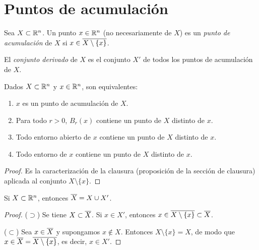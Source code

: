 \section{Puntos de acumulación}

\begin{definition}
  Sea \(X \subset \mathbb{R}^n\). Un punto \(x \in \mathbb{R}^n\) (no necesariamente de \(X\)) es un \emph{punto de acumulación} de \(X\) si \(x \in \overline{X \setminus \{x\}}\).
\end{definition}

\begin{definition}
  El \emph{conjunto derivado} de \(X\) es el conjunto \(X'\) de todos los puntos de acumulación de \(X\).
\end{definition}

\begin{prop}
  Dados \(X \subset \mathbb{R}^n\) y \(x \in \mathbb{R}^n\), son equivalentes:
  \begin{enumerate}[label=(\arabic*)]
    \item \(x\) es un punto de acumulación de \(X\).
    \item Para todo \(r > 0\), \(B_r(x)\) contiene un punto de \(X\) distinto de \(x\).
    \item Todo entorno abierto de \(x\) contiene un punto de \(X\) distinto de \(x\).
    \item Todo entorno de \(x\) contiene un punto de \(X\) distinto de \(x\).
  \end{enumerate}
\end{prop}

\begin{proof}
  Es la caracterización de la clausura (proposición de la sección de clausura) aplicada al conjunto \(X \setminus \{x\}\).
\end{proof}

\begin{prop}
  Si \(X \subset \mathbb{R}^n\), entonces \(\overline{X} = X \cup X'\).
\end{prop}

\begin{proof}
  (\(\supset\)) Se tiene \(X \subset \overline{X}\). Si \(x \in X'\), entonces \(x \in \overline{X \setminus \{x\}} \subset \overline{X}\).

  (\(\subset\)) Sea \(x \in \overline{X}\) y supongamos \(x \notin X\). Entonces \(X \setminus \{x\} = X\), de modo que \(x \in \overline{X} = \overline{X \setminus \{x\}}\), es decir, \(x \in X'\).
\end{proof}

